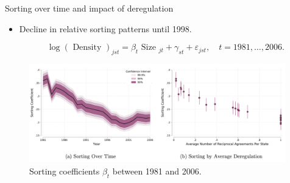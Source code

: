 \documentclass[notes,10pt, aspectratio=169]{beamer}
\begin{document}
    \begin{frame}{Sorting over time and impact of deregulation}\label{sorting_time}
    \begin{itemize}
        \item Decline in relative sorting patterns until 1998.  %
\hyperlink{stag_time}{}
    
    $$
    \log (\text { Density })_{j s t}=\beta_t \text { Size }_{j t}+\gamma_{s t}+\varepsilon_{j s t}, \quad t=1981, \ldots, 2006 .
    $$
    \end{itemize}
    
    
    \begin{figure}
        \centering
        \includegraphics[width=0.99\textwidth]{imgs/fig10.png}
        \caption*{Sorting coefficients $\beta_t$ between 1981 and 2006.}
        \label{fig:my_label}
    \end{figure}
    
    \end{frame}
\end{document}
